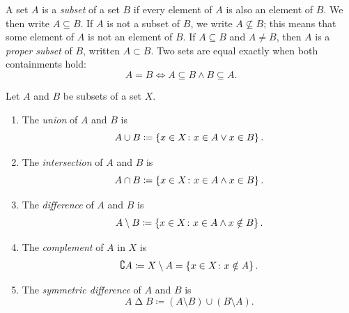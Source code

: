 \documentclass[11pt,a4paper]{amsart}
\begin{document}
\begin{definition}
  A set \(A\) is a \emph{subset} of a set \(B\) if every element of \(A\) is
  also an element of \(B\). We then write \(A \subseteq B\). If \(A\) is not a
  subset of \(B\), we write \(A \nsubseteq B\); this means that some element of
  \(A\) is not an element of \(B\). If \(A \subseteq B\) and \(A \neq B\), then
  \(A\) is a \emph{proper subset} of \(B\), written \(A \subset B\).
  Two sets are equal exactly when both containments hold:
  \[
    A = B \iff A \subseteq B \land B \subseteq A.
  \]
\end{definition}

\begin{definition}
  Let \(A\) and \(B\) be subsets of a set \(X\).
  \begin{enumerate}
    \item The \emph{union} of \(A\) and \(B\) is
      \[
        A \cup B \coloneqq
        \left\lbrace x \in X \colon x \in A \lor x \in B\right\rbrace.
      \]
    \item The \emph{intersection} of \(A\) and \(B\) is
      \[
        A \cap B \coloneqq
        \left\lbrace x \in X \colon x \in A \land x \in B\right\rbrace.
      \]
    \item The \emph{difference} of \(A\) and \(B\) is
      \[
        A \setminus B \coloneqq
        \left\lbrace x \in X \colon x \in A \land x \notin B\right\rbrace.
      \]
    \item The \emph{complement} of \(A\) in \(X\) is
      \[
        \complement{A} \coloneqq X \setminus A
        = \left\lbrace x \in X \colon x \notin A\right\rbrace.
      \]
    \item The \emph{symmetric difference} of \(A\) and \(B\) is
      \[
        A \mathbin{\Delta} B \coloneqq
        (A \setminus B) \cup (B \setminus A).
      \]
  \end{enumerate}
\end{definition}
\end{document}
